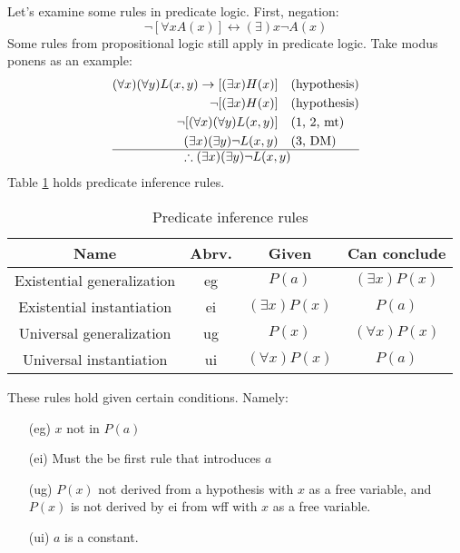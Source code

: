 \documentclass[nobib]{tufte-handout}
\let\biconditional\leftrightarrow
\begin{document}
Let's examine some rules in predicate logic. First, negation: 
\[\neg [\forall x A(x)] \biconditional (\exists)x \neg A(x)\]
Some rules from propositional logic still apply in predicate logic. Take 
modus ponens as an example:
\begin{align*}
    (\forall x)(\forall y)L(x,y) \rightarrow [(\exists x) H(x)] \quad &\text{(hypothesis)}\\
    \neg [(\exists x) H(x)] \quad &\text{(hypothesis)}\\
    \neg [(\forall x)(\forall y)L(x,y)] \quad &\text{(1, 2, mt)}\\
    (\exists x) (\exists y) \neg L(x,y) \quad &\text{(3, DM)}\\
    \hline
    \therefore (\exists x) (\exists y) \neg L(x,y) \notag
\end{align*}
Table \ref{tab:predinferencerules} holds predicate inference rules. 
\begin{table}[ht]
    \centering
    \caption{Predicate inference rules}
    \begin{tabular}{|c|c|c|c|}
    \hline
    Name & Abrv. & Given & Can conclude\\
    \hline
    Existential generalization & eg & $P(a)$ & $(\exists x)P(x)$\\
    \hline
    Existential instantiation & ei & $(\exists x)P(x)$ & $P(a)$\\
    \hline
    Universal generalization & ug & $P(x)$ & $(\forall x)P(x)$\\
    \hline
    Universal instantiation & ui & $(\forall x)P(x)$ & $P(a)$\\
    \hline
    \end{tabular}
    \label{tab:predinferencerules}
\end{table}
These rules hold given certain conditions. Namely:
\begin{enumerate}
    \item[(eg)] $x$ not in $P(a)$ 
    \item[(ei)] Must the be first rule that introduces $a$ 
    \item[(ug)] $P(x)$ not derived from a hypothesis
    with $x$ as a free variable, and $P(x)$ is not derived by ei from wff with $x$ as a free variable. 
    \item[(ui)] $a$ is a constant. 
\end{enumerate}
\end{document}
